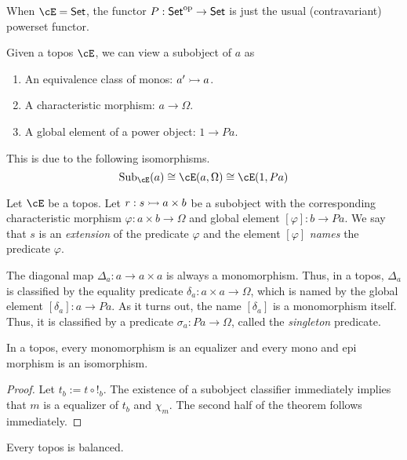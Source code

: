 \documentclass[article,10pt,oneside]{memoir}
\begin{document}
\begin{eg}
  When $\cE = \CSet$, the functor $P : \mathsf{Set}^{\mathrm{op}} \to \mathsf{Set}$ is just the usual (contravariant) powerset functor.
\end{eg}

\begin{rmk}
  Given a topos $\cE$, we can view a subobject of $a$ as
  \begin{enumerate}
  \item An equivalence class of monos: $a' \rightarrowtail a$.
  \item A characteristic morphism: $a \to \Omega$.
  \item A global element of a power object: $1 \to Pa$.
  \end{enumerate}
  This is due to the following isomorphisms.
  \[
    \Sub_{\cE}(a) \iso \cE(a, \Omega) \iso \cE(1, Pa)
  \]
\end{rmk}

\begin{defn}
  Let $\cE$ be a topos.
  Let $r : s \rightarrowtail a \times b$ be a subobject with the corresponding characteristic morphism $\varphi : a \times b \to \Omega$ and global element $[\varphi] : b \to Pa$.
  We say that $s$ is an \emph{extension} of the predicate $\varphi$ and the element $[\varphi]$ \emph{names} the predicate $\varphi$.
\end{defn}

\begin{eg}
  The diagonal map $\Delta_{a} : a \to a \times a$ is always a monomorphism.
  Thus, in a topos, $\Delta_{a}$ is classified by the equality predicate $\delta_{a} : a \times a \to \Omega$, which is named by the global element $[\delta_{a}] : a \to Pa$.
  As it turns out, the name $[\delta_{a}]$ is a monomorphism itself.
  Thus, it is classified by a predicate $\sigma_{a} : Pa \to \Omega$, called the \emph{singleton} predicate.
\end{eg}

\begin{thm}
  In a topos, every monomorphism is an equalizer and every mono and epi morphism is an isomorphism.
\end{thm}
\begin{proof}
  Let $t_{b} := t \circ !_{b}$.
  The existence of a subobject classifier immediately implies that $m$ is a equalizer of $t_{b}$ and $\chi_{m}$.
  The second half of the theorem follows immediately.
\end{proof}

\begin{cor}
  Every topos is balanced.
\end{cor}



\end{document}
